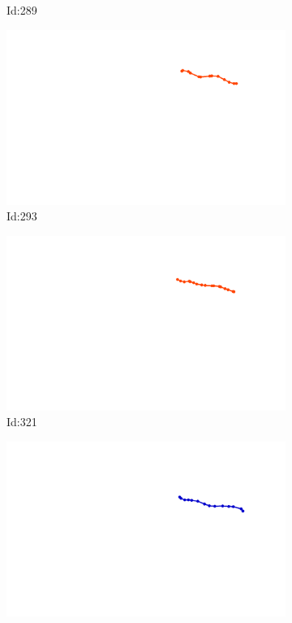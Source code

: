 \documentclass[12pt,twoside]{report}
\begin{document}
\begin{figure}
\begin{subfigure}[b]{0.20\textwidth}
\caption{Id:289}
\end{subfigure}
\begin{subfigure}[b]{0.20\textwidth}
\centering
\includegraphics[width=\textwidth]{../../trajectories/293.png}
\caption{Id:293}
\end{subfigure}
\begin{subfigure}[b]{0.20\textwidth}
\centering
\includegraphics[width=\textwidth]{../../trajectories/321.png}
\caption{Id:321}
\end{subfigure}
\begin{subfigure}[b]{0.20\textwidth}
\centering
\includegraphics[width=\textwidth]{../../trajectories/518.png}

\end{subfigure}
\end{figure}
\end{document}
